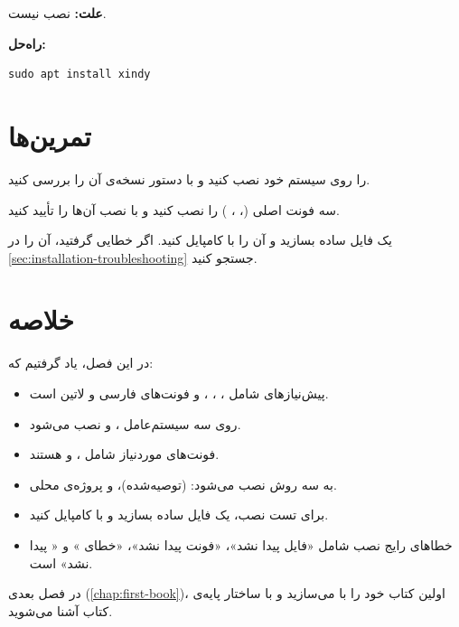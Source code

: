 \textbf{علت:}  نصب نیست.

\textbf{راه‌حل:}
\begin{latin}
\begin{verbatim}
sudo apt install xindy
\end{verbatim}
\end{latin}


\section{تمرین‌ها}
\label{sec:installation-exercises}

\begin{exercise}
     را روی سیستم خود نصب کنید
    و با دستور  نسخه‌ی آن را
    بررسی کنید.
    \label{exc:installation-texlive}
\end{exercise}

\begin{exercise}
    سه فونت اصلی  (،
    ، ) را نصب
    کنید و با  نصب آن‌ها را تأیید کنید.
    \label{exc:installation-fonts}
\end{exercise}

\begin{exercise}
    یک فایل  ساده بسازید و آن را
    با  کامپایل کنید.
    اگر خطایی گرفتید، آن را در \cref{sec:installation-troubleshooting}
    جستجو کنید.
    \label{exc:installation-test}
\end{exercise}

\section{خلاصه}
\label{sec:installation-summary}

در این فصل، یاد گرفتیم که:

\begin{itemize}
    \item پیش‌نیازهای  شامل
    ، ، ،
     و فونت‌های فارسی و لاتین است.

    \item {} روی سه سیستم‌عامل
    ،  و  نصب
    می‌شود.

    \item فونت‌های موردنیاز شامل
    ،  و
     هستند.

    \item {} به سه روش نصب می‌شود:
     (توصیه‌شده)،  و
    پروژه‌ی محلی.

    \item برای تست نصب، یک فایل ساده بسازید
    و با  کامپایل کنید.

    \item خطاهای رایج نصب شامل «فایل پیدا نشد»،
    «فونت پیدا نشد»، «خطای » و
    « پیدا نشد» است.
\end{itemize}

در فصل بعدی (\cref{chap:first-book})، اولین
کتاب خود را با  می‌سازید و
با ساختار پایه‌ی کتاب آشنا می‌شوید.